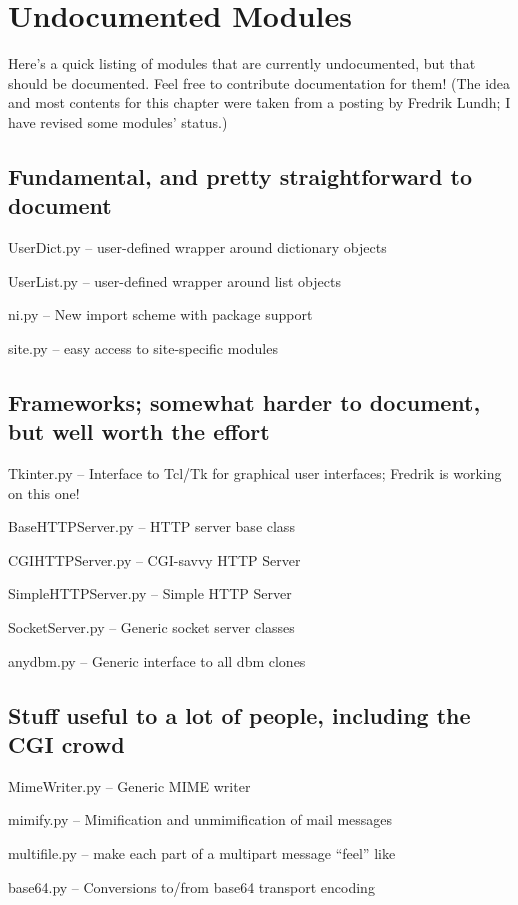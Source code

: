 \chapter{Undocumented Modules}

Here's a quick listing of modules that are currently undocumented, but
that should be documented.  Feel free to contribute documentation for
them!  (The idea and most contents for this chapter were taken from a
posting by Fredrik Lundh; I have revised some modules' status.)


\section{Fundamental, and pretty straightforward to document}

UserDict.py -- user-defined wrapper around dictionary objects

UserList.py -- user-defined wrapper around list objects

ni.py -- New import scheme with package support

site.py -- easy access to site-specific modules


\section{Frameworks; somewhat harder to document, but
well worth the effort}

Tkinter.py -- Interface to Tcl/Tk for graphical user interfaces;
Fredrik is working on this one!

BaseHTTPServer.py -- HTTP server base class

CGIHTTPServer.py -- CGI-savvy HTTP Server

SimpleHTTPServer.py -- Simple HTTP Server

SocketServer.py -- Generic socket server classes

anydbm.py -- Generic interface to all dbm clones


\section{Stuff useful to a lot of people, including the CGI crowd}

MimeWriter.py -- Generic MIME writer

mimify.py -- Mimification and unmimification of mail messages

multifile.py -- make each part of a multipart message ``feel'' like

base64.py -- Conversions to/from base64 transport encoding

